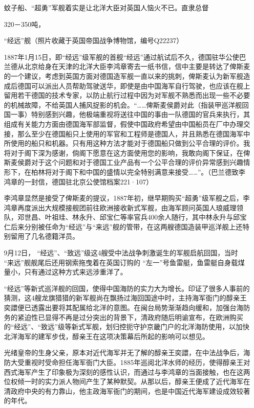 \documentclass[12pt,UTF8]{ctexbook}
\begin{document}
蚊子船、“超勇”军舰着实是让北洋大臣对英国人恼火不已。直隶总督

320－350吨，

“经远”舰（照片收藏于英国帝国战争博物馆，编号Q22237）

1887年1月15日，即“经远”级军舰的首舰“经远”通过航试后不久，德国驻华公使巴兰德从北京给身在天津的北洋大臣李鸿章寄去一纸书信，信中主要是转达了俾斯麦的一个建议，考虑到英国方面对德国造军舰一直以来的挑刺，俾斯麦认为新军舰造成后德国可以派出人员帮助驾驶送华，即使是由中国海军自行驾驶，也应该在舰上留用若干德国的技术专家，以防止航行过程中因为对军舰不熟悉而出现一些不必要的机械故障，不给英国人捕风捉影的机会。“……俾斯麦侯爵对此（指装甲巡洋舰回国一事）特别感到兴趣，他极端重视将送往中国的事由一队德国的官兵来执行，其组成有关能力方面由德国海军部监督，假使中国政府希望由中国船员在厂中办理交接，那么至少在德国船只上使用的军官和工程师是德国人，并且熟悉在德国海军中所使用的船只和机器。只有用这种方法才能对于德国船只做到公平合理的评价。我将对于阁下深为感谢，倘阁下愿意在这方面使用您的影响，我敢向阁下保证，在俾斯麦侯爵对于这个问题和对于德国工业产品有一个公平合理的评价异常感到兴趣情形下，在柏林将对于阁下和中国的盛情以完全特别满意来接受……”。（巴兰德致李鸿章的一封信，德国驻北京公使馆档案221·107）

李鸿章显然是接受了俾斯麦的提议，1887年初，继早期购买“超勇”级军舰之后，李鸿章再度派出大规模接舰团前往欧洲接收新式军舰，由海军顾问英国人琅威理领队，邓世昌、叶祖珪、林永升、邱宝仁等率官兵400余人随行，其中林永升与邱宝仁后来分别被任命为“经远”与“来远”舰的管带，在这两艘德国造装甲巡洋舰上还特别留用了几名德籍洋员。

9月12日， “经远”、“致远”级这4艘受中法战争刺激诞生的军舰启航回国，当时 “来远”舰舰尾后还用钢索拖曳着在英国订购的 “左一”号鱼雷艇，鱼雷艇自身载煤量小，只有通过这种方式来远涉重洋了。

“经远”等新式巡洋舰的回国，使得中国海防的实力大为增长。印证了很多人事前的猜测，这4艘龙旗猎猎的新军舰尚在飘扬过海回国途中时，主持海军衙门的醇亲王奕譞便已透露出要将其配属给北洋的意图。在闽台局势渐渐趋向缓和，加强台海防务的紧迫性已显得不再是过分突出的背景下，清政府随后明谕宣布，在欧洲购买的“经远”、“致远”级等新式军舰，划归控扼守护京畿门户的北洋海防使用，以加快北洋海军的建军步伐，醇亲王在这项决策幕后所起的影响可以想见。

光绪皇帝的生身父亲，原本对近代海军并无了解的醇亲王奕譞，在中法战争后，海防大受重视时受命担任海军衙门大臣。1885年巡阅北洋水师的经历，使得醇亲王对西式海军产生了印象极为深刻的感性认识，而通过与李鸿章的当面接触，也在这两位权倾一时的实力派人物间产生了某种默契。从那以后，醇亲王便成了近代海军在清政府中央的有力靠山，他主政海军衙门的期间，也是中国近代海军建设成效较著的年代。
\end{document}
